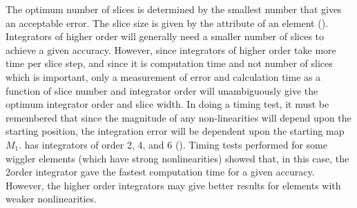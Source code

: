 The optimum number of slices is determined by the smallest number that
gives an acceptable error. The slice size is given by the 
attribute of an element ().  Integrators of higher order
will generally need a smaller number of slices to achieve a given
accuracy. However, since integrators of higher order take more time
per slice step, and since it is computation time and not number of
slices which is important, only a measurement of error and calculation
time as a function of slice number and integrator order will
unambiguously give the optimum integrator order and slice width.  In
doing a timing test, it must be remembered that since the magnitude of
any non-linearities will depend upon the starting position, the
integration error will be dependent upon the starting map $M_1$. \bmad
has integrators of order 2, 4, and 6 (). Timing tests
performed for some wiggler elements (which have strong nonlinearities)
showed that, in this case, the 2\Nd order integrator gave the fastest
computation time for a given accuracy. However, the higher order
integrators may give better results for elements with weaker
nonlinearities.
